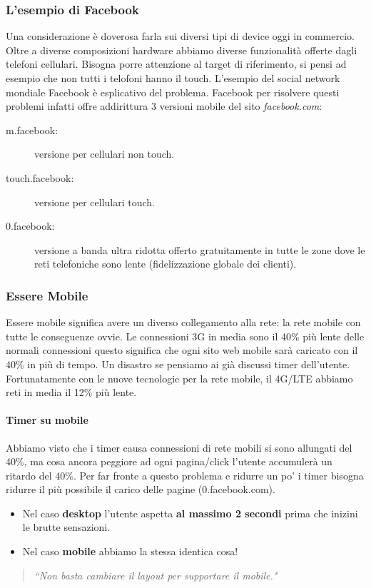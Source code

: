 		\subsubsection{L'esempio di Facebook}
			Una considerazione è doverosa farla sui diversi tipi di device oggi in commercio. Oltre a diverse composizioni hardware abbiamo diverse funzionalità offerte dagli telefoni cellulari. Bisogna porre attenzione al target di riferimento, si pensi ad esempio che non tutti i telofoni hanno il touch.
			L'esempio del social network mondiale Facebook è esplicativo del problema. Facebook per risolvere questi problemi infatti offre addirittura 3 versioni mobile del sito \emph{facebook.com}:
			\begin{description}
				\item [m.facebook:] versione per cellulari non touch.
				\item [touch.facebook:] versione per cellulari touch.
				\item [0.facebook:] versione a banda ultra ridotta offerto gratuitamente in tutte le zone dove le reti telefoniche sono lente (fidelizzazione globale dei clienti).		
			\end{description}
		
		\subsubsection{Essere Mobile}
			Essere mobile significa avere un diverso collegamento alla rete: la rete mobile con tutte le conseguenze ovvie.
			Le connessioni 3G in media sono il 40\% più lente delle normali connessioni questo significa che ogni sito web mobile sarà caricato con il 40\% in più di tempo. Un disastro se pensiamo ai già discussi timer dell'utente. Fortunatamente con le nuove tecnologie per la rete mobile, il 4G/LTE abbiamo reti in media il 12\% più lente.
			
			\paragraph{Timer su mobile}
				Abbiamo visto che i timer causa connessioni di rete mobili si sono allungati del 40\%, ma cosa ancora peggiore ad ogni pagina/click l'utente accumulerà un ritardo del 40\%. Per far fronte a questo problema e ridurre un po' i timer bisogna ridurre il più possibile il carico delle pagine (0.facebook.com). 
				\begin{itemize}
					\item Nel caso \textbf{desktop} l'utente aspetta \textbf{al massimo 2 secondi} prima che inizini le brutte sensazioni.
					\item Nel caso \textbf{mobile} abbiamo la stessa identica cosa!
				\end{itemize}
				\begin{quote}
					\emph{``Non basta cambiare il layout per supportare il mobile."}  
				\end{quote}
